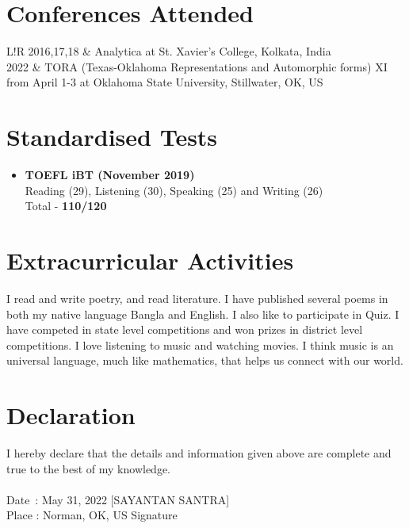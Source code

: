 \documentclass{article}
\newcommand\VRule{\color{lightgray}\vrule width 0.5pt}
\begin{document}
\section*{Conferences Attended}
\begin{tabular}{L!{\VRule}R}
	2016,17,18 & Analytica at St. Xavier's College, Kolkata, India                                                                              \\
	2022       & TORA (Texas-Oklahoma Representations and Automorphic forms) XI from April 1-3 at Oklahoma State University, Stillwater, OK, US
\end{tabular}
\section*{Standardised Tests}
\begin{itemize}
	\item {\bf TOEFL iBT (November 2019)} \\
	      Reading (29), Listening (30), Speaking (25) and Writing (26) \\
	      Total - {\bf 110/120}
\end{itemize}
\section*{Extracurricular Activities}
I read and write poetry, and read literature. I have published several poems in both my native language Bangla and English. I also like to participate in Quiz. I have competed in state level competitions and won prizes in district level competitions. I love listening to music and watching movies. I think music is an universal language, much like mathematics, that helps us connect with our world.
\section*{Declaration}
I hereby declare that the details and information given above are complete and true to the best of my knowledge. \\
\vspace{2cm} \\
Date \,: May 31, 2022 \hfill [SAYANTAN SANTRA] \\
Place  : Norman, OK, US \hfill Signature \hspace{1cm} \\
\end{document}
